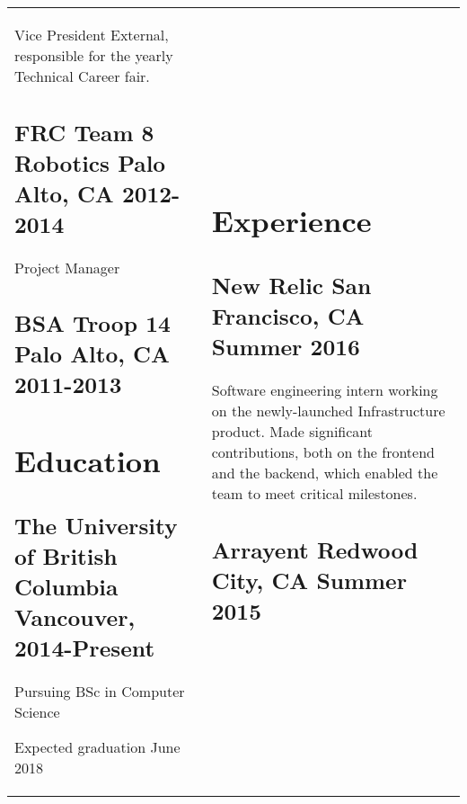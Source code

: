 \documentclass[letterpaper]{article}
\newlength{\leftcol}
\newlength{\rightcol}
\newcommand{\subtitle}{\normalfont\sffamily\color{black}\large}
\begin{document}
\begin{tabularx}{\textwidth}{@{}p{\leftcol} p{\rightcol}}
Vice President External, responsible for the yearly Technical Career fair.

\subsection*{FRC Team 8 Robotics \newline\subtitle Palo Alto, CA 2012-2014}

Project Manager

\subsection*{BSA Troop 14 \newline\subtitle Palo Alto, CA 2011-2013}

\section*{Education}

\subsection*{The University of \newline British Columbia \newline\subtitle
  Vancouver, 2014-Present}

Pursuing BSc in Computer Science

Expected graduation June 2018

&

\vspace*{2pt}

\section*{Experience}


\subsection*{New Relic \subtitle \hfill San Francisco, CA Summer 2016}

Software engineering intern working on the newly-launched Infrastructure
product. Made significant contributions, both on the frontend and the backend,
which enabled the team to meet critical milestones.

\subsection*{Arrayent \subtitle \hfill Redwood City, CA Summer 2015}


\end{tabularx}
\end{document}
